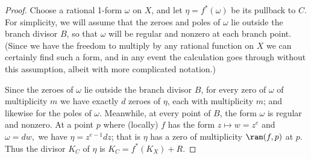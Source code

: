 \begin{proof}
Choose a rational 1-form $\omega$ on $X$, and let $\eta = f^*(\omega)$ be its pullback to $C$. For simplicity, we will assume that the zeroes and poles of $\omega$ lie outside the branch divisor $B$, so that $\omega$ will be regular and nonzero at each branch point. (Since we have the freedom to multiply by any rational function on $X$ we can certainly find such a form, and in any event the calculation goes through without this assumption, albeit with more complicated notation.) 

Since the zeroes of $\omega$ lie outside the branch divisor $B$, for every zero of $\omega$ of multiplicity $m$ we have exactly $d$ zeroes of $\eta$, each with multiplicity $m$; and likewise for the poles of $\omega$. Meanwhile, at every point of $B$, the form $\omega$ is regular and nonzero. At a point $p$ where (locally) $f$ has the form $z \mapsto w = z^{e}$
and $\omega = dw,$ we have $\eta = z^{e-1}dz$; that is $\eta$ has a zero of multiplicity $\ram(f,p)$ at  $p$.
Thus the divisor $K_{C}$ of $\eta$ is
$K_{C} = f^{*}(K_{X})+R$.
\end{proof}

